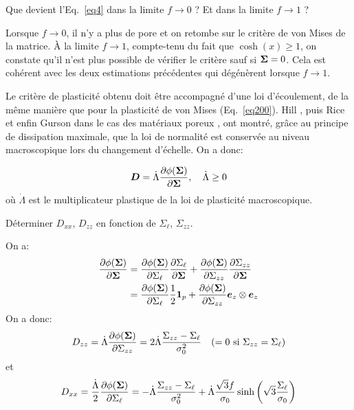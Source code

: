 \documentclass[french,12pt]{exam}
\begin{document}
\begin{questions}
\question Que devient l'Eq.~\eqref{eq4} dans la limite $f \to 0$ ? Et dans la limite $f \to 1$ ?
\begin{solution}
Lorsque $f\to 0$, il n'y a plus de pore et on retombe sur le critère de von Mises de la matrice. \`A la limite $f\to 1$, compte-tenu du fait que $\cosh(x)\geq 1$, on constate qu'il n'est plus possible de vérifier le critère sauf si $\boldsymbol{\Sigma}=0$.
Cela est cohérent avec les deux estimations précédentes qui dégénèrent lorsque $f\to 1$.
\end{solution}

Le critère de plasticité obtenu doit être accompagné d'une loi d'écoulement, de la même manière que pour la plasticité de von Mises (Eq.~\ref{eq200}). Hill \cite{hill}, puis Rice \cite{rice} et enfin Gurson \cite{gurson} dans le cas des matériaux poreux , ont montré, grâce au principe de dissipation maximale, que la loi de normalité est conservée au niveau macroscopique lors du changement d'échelle. On a donc:

  \begin{equation}
     \boldsymbol{D} = \dot{\Lambda} \frac{\partial \phi(\boldsymbol{\Sigma})}{\partial \boldsymbol{\Sigma}},  \quad \dot{\Lambda}\geq 0
  \end{equation}
où $\dot{\Lambda}$ est le multiplicateur plastique de la loi de plasticité macroscopique.

\question Déterminer $D_{xx}$, $D_{zz}$ en fonction de $\Sigma_\ell$, $\Sigma_{zz}$.
 \begin{solution}
 On a:
\begin{align*}
\frac{\partial \phi(\boldsymbol{\Sigma})}{\partial \boldsymbol{\Sigma}} &= \frac{\partial \phi(\boldsymbol{\Sigma})}{\partial \Sigma_\ell}\frac{\partial \Sigma_\ell}{\partial \boldsymbol{\Sigma}} + \frac{\partial \phi(\boldsymbol{\Sigma})}{\partial \Sigma_{zz}}\frac{\partial \Sigma_{zz}}{\partial \boldsymbol{\Sigma}}\\
 &= \frac{\partial \phi(\boldsymbol{\Sigma})}{\partial \Sigma_\ell}\dfrac{1}{2}\boldsymbol{1}_p + \frac{\partial \phi(\boldsymbol{\Sigma})}{\partial \Sigma_{zz}}\boldsymbol{e}_z\otimes\boldsymbol{e}_z
\end{align*}
On a donc:
 $$D_{zz} = \dot{\Lambda}\dfrac{\partial \phi(\boldsymbol{\Sigma})}{\partial \Sigma_{zz}} = 2\dot{\Lambda}\dfrac{\Sigma_{zz}-\Sigma_\ell}{\sigma_0^2} \quad (=0\text{ si } \Sigma_{zz}=\Sigma_\ell)$$
et
$$D_{xx} = \dfrac{\dot{\Lambda}}{2}\dfrac{\partial \phi(\boldsymbol{\Sigma})}{\partial \Sigma_\ell} = -\dot{\Lambda}\dfrac{\Sigma_{zz}-\Sigma_\ell}{\sigma_0^2} +  \dot{\Lambda}\dfrac{\sqrt{3}f}{\sigma_0} \sinh{\left(  \sqrt{3} \frac{\Sigma_\ell}{\sigma_0} \right)} $$
 \end{solution} 



\end{questions}
\end{document}
